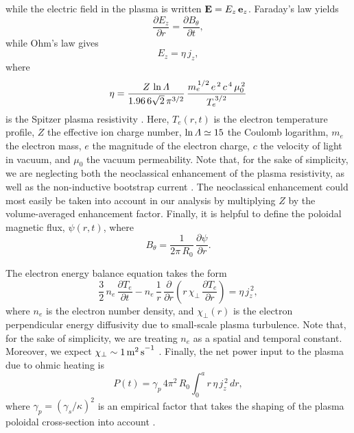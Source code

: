 \documentclass{iopjournal}
\begin{document}
while the electric field in the plasma is written ${\bf E}= E_z\,{\bf e}_z$. Faraday's law yields
\begin{equation}
\frac{\partial E_z}{\partial r} = \frac{\partial B_\theta}{\partial t},
\end{equation}
while Ohm's law gives
\begin{equation}
E_z = \eta\,j_z,
\end{equation}
where
\begin{equation}
\eta = \frac{Z\,\ln{\mit\Lambda}}{1.96\,6\sqrt{2}\,\pi^{3/2}}\,\frac{m_e^{\,1/2}\,e^{\,2}\,c^{\,4}\,\mu_0^{\,2}}{T_e^{\,3/2}}
\end{equation}
is the Spitzer plasma resistivity \cite{spitzer,fitz}. Here, $T_e(r,t)$ is the electron temperature profile, $Z$ the effective ion charge number, $\ln{\mit\Lambda}\simeq 15$ the
Coulomb logarithm, $m_e$ the electron mass, $e$ the magnitude of the electron charge, $c$ the velocity of light in vacuum, and
$\mu_0$ the vacuum permeability. 
Note that, for the sake of simplicity, we are neglecting both the neoclassical enhancement of the plasma resistivity, as well as 
the non-inductive bootstrap current \cite{fitz1}. The neoclassical  enhancement could most easily be taken into account in our analysis by multiplying $Z$
 by the volume-averaged enhancement factor. 
 Finally, it is helpful to define the poloidal magnetic flux, $\psi(r,t)$, where 
\begin{equation}
B_\theta =  \frac{1}{2\pi\,R_0}\,\frac{\partial\psi}{\partial r}.
\end{equation}

The electron energy balance equation takes the form\,\cite{fitz}
\begin{equation}
\frac{3}{2}\,n_e\,\frac{\partial T_e}{\partial t} - n_e\,\frac{1}{r}\,\frac{\partial}{\partial r}\left(r\,\chi_\perp\,\frac{\partial T_e}{\partial r}\right)
 = \eta\,j_z^{\,2},
 \end{equation}
 where $n_e$ is the electron number density, and $\chi_\perp(r)$ is the electron perpendicular energy diffusivity due to small-scale plasma turbulence. 
 Note that, for the sake of simplicity, we are treating $n_e$ as a spatial and temporal constant. Moreover, we expect $\chi_\perp \sim 1\,{\rm m^2\,s}^{-1}$ \cite{book}.
 Finally, the net power input to the plasma due to ohmic heating is
 \begin{equation}
 P(t) = \gamma_p\,4\pi^2\,R_0\int_0^a r\,\eta\,j_z^{\,2}\,dr,
 \end{equation}
 where $\gamma_p= (\gamma_s/\kappa)^2$ is an empirical factor that takes the shaping of the plasma poloidal cross-section into account \cite{uckam}.
\end{document}
